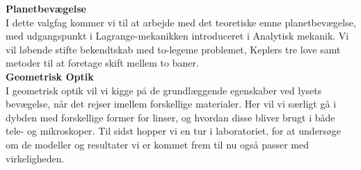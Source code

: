 \documentclass[a4paper,oneside,article]{memoir}
\begin{document}
\textbf{Planetbevægelse}\\
I dette valgfag kommer vi til at arbejde med det teoretiske emne planetbevægelse, med udgangspunkt i Lagrange-mekanikken introduceret i Analytisk mekanik. Vi vil løbende stifte bekendtskab med to-legeme problemet, Keplers tre love samt metoder til at foretage skift mellem to baner.\\

\textbf{Geometrisk Optik}\\
I geometrisk optik vil vi kigge på de grundlæggende egenskaber ved lysets bevægelse, når det rejser imellem forskellige materialer. Her vil vi særligt gå i dybden med forskellige former for linser, og hvordan disse bliver brugt i både tele- og mikroskoper. Til sidst hopper vi en tur i laboratoriet, for at undersøge om de modeller og resultater vi er kommet frem til nu også passer med virkeligheden.\\
\end{document}
